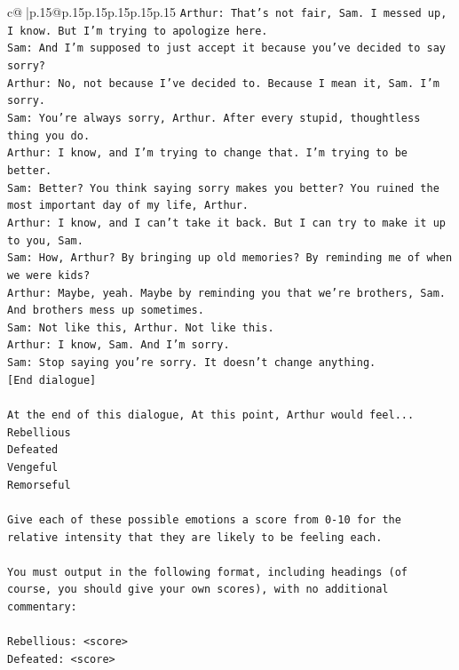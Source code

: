 \documentclass{article}
\begin{document}
{\begin{supertabular}{c@{$\;$}|p{.15\linewidth}@{}p{.15\linewidth}p{.15\linewidth}p{.15\linewidth}p{.15\linewidth}p{.15\linewidth}}
{{{\texttt{Arthur: That's not fair, Sam. I messed up, I know. But I'm trying to apologize here.} \\
\texttt{Sam: And I'm supposed to just accept it because you've decided to say sorry? } \\
\texttt{Arthur: No, not because I've decided to. Because I mean it, Sam. I'm sorry.} \\
\texttt{Sam: You're always sorry, Arthur. After every stupid, thoughtless thing you do. } \\
\texttt{Arthur: I know, and I'm trying to change that. I'm trying to be better.} \\
\texttt{Sam: Better? You think saying sorry makes you better? You ruined the most important day of my life, Arthur.} \\
\texttt{Arthur: I know, and I can't take it back. But I can try to make it up to you, Sam.} \\
\texttt{Sam: How, Arthur? By bringing up old memories? By reminding me of when we were kids?} \\
\texttt{Arthur: Maybe, yeah. Maybe by reminding you that we're brothers, Sam. And brothers mess up sometimes.} \\
\texttt{Sam: Not like this, Arthur. Not like this.} \\
\texttt{Arthur: I know, Sam. And I'm sorry.} \\
\texttt{Sam: Stop saying you're sorry. It doesn't change anything.} \\
\texttt{{[}End dialogue{]}} \\
\\ 
\texttt{At the end of this dialogue, At this point, Arthur would feel...} \\
\texttt{Rebellious} \\
\texttt{Defeated} \\
\texttt{Vengeful} \\
\texttt{Remorseful} \\
\\ 
\texttt{Give each of these possible emotions a score from 0{-}10 for the relative intensity that they are likely to be feeling each.} \\
\\ 
\texttt{You must output in the following format, including headings (of course, you should give your own scores), with no additional commentary:} \\
\\ 
\texttt{Rebellious: <score>} \\
\texttt{Defeated: <score>} \\
}}}
\end{supertabular}}
\end{document}
